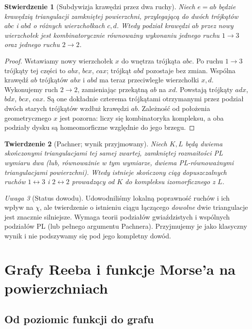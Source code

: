 \documentclass[11pt,a4paper]{report}
\numberwithin{equation}{section}
\theoremstyle{plain}
\newtheorem{twierdzenie}{Twierdzenie}[section]
\newtheorem{stwierdzenie}[twierdzenie]{Stwierdzenie}
\theoremstyle{definition}
\theoremstyle{remark}
\newtheorem{uwaga}[twierdzenie]{Uwaga}
\begin{document}
\begin{stwierdzenie}[Subdywizja krawędzi przez dwa ruchy]
Niech $e=ab$ będzie krawędzią triangulacji zamkniętej
powierzchni, przylegającą do dwóch trójkątów $abc$
i $abd$ o różnych wierzchołkach $c,d$. Wtedy podział krawędzi $ab$ przez nowy wierzchołek
jest kombinatorycznie równoważny wykonaniu jednego
ruchu $1\to3$ oraz jednego ruchu $2\to2$.
\end{stwierdzenie}

\begin{proof}
Wstawiamy nowy wierzchołek $x$ do wnętrza trójkąta $abc$.
Po ruchu $1\to3$ trójkąty tej części to $abx$, $bcx$, $cax$;
trójkąt $abd$ pozostaje bez zmian. Wspólna krawędź $ab$
trójkątów $abx$ i $abd$ ma teraz przeciwległe wierzchołki
$x,d$. Wykonujemy ruch $2\to2$, zamieniając przekątną
$ab$ na $xd$. Powstają trójkąty $adx$, $bdx$, $bcx$, $cax$.
Są one dokładnie czterema trójkątami otrzymanymi przez
podział dwóch starych trójkątów wzdłuż krawędzi $ab$.
Zależność od położenia geometrycznego $x$ jest pozorna:
liczy się kombinatoryka kompleksu, a oba podziały
dysku są homeomorficzne względnie do jego brzegu.
\end{proof}

\begin{twierdzenie}[Pachner; wynik przyjmowany]
Niech $K,L$ będą dwiema skończonymi triangulacjami
tej samej zwartej, zamkniętej rozmaitości PL
wymiaru dwa (lub, równoważnie w tym wymiarze,
dwiema PL-równoważnymi triangulacjami powierzchni).
Wtedy istnieje skończony ciąg dopuszczalnych ruchów
$1\leftrightarrow3$ i $2\leftrightarrow2$ prowadzący
od $K$ do kompleksu izomorficznego z $L$.
\end{twierdzenie}

\begin{uwaga}[Status dowodu]
Udowodniliśmy lokalną poprawność ruchów i ich wpływ na
$\chi$, ale twierdzenie o istnieniu ciągu łączącego
\emph{dowolne} dwie triangulacje jest znacznie silniejsze.
Wymaga teorii podziałów gwiaździstych i wspólnych
podziałów PL (lub pełnego argumentu Pachnera).
Przyjmujemy je jako klasyczny wynik i nie podszywamy
się pod jego kompletny dowód.
\end{uwaga}

\chapter{Grafy Reeba i funkcje Morse'a na powierzchniach}
\label{ch:tg-reeb}

\section{Od poziomic funkcji do grafu}
\label{sec:tg-reeb-def}
\end{document}
